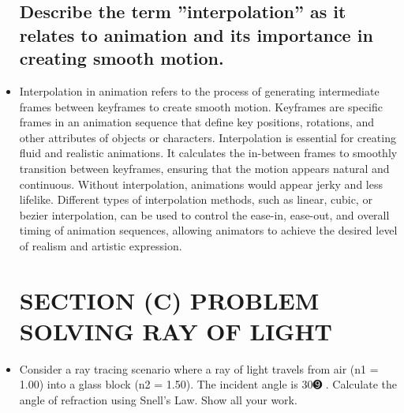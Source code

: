 \documentclass{article}
\begin{document}
\begin{itemize}
\subsection{Describe the term ”interpolation” as it relates
to animation and its importance in creating smooth
motion.}
\item  Interpolation in animation refers to the process of generating intermediate
frames between keyframes to create smooth motion. Keyframes are specific frames in an animation sequence that define key positions, rotations,
and other attributes of objects or characters. Interpolation is essential
for creating fluid and realistic animations. It calculates the in-between
frames to smoothly transition between keyframes, ensuring that the motion appears natural and continuous. Without interpolation, animations
would appear jerky and less lifelike. Different types of interpolation methods, such as linear, cubic, or bezier interpolation, can be used to control
the ease-in, ease-out, and overall timing of animation sequences, allowing
animators to achieve the desired level of realism and artistic expression.
\section{ SECTION (C) PROBLEM SOLVING RAY
OF LIGHT}
\item  Consider a ray tracing scenario where a ray of
light travels from air (n1 = 1.00) into a glass block (n2
= 1.50). The incident angle is 30➒ . Calculate the angle
of refraction using Snell’s Law. Show all your work.
\end{itemize}
\end{document}
